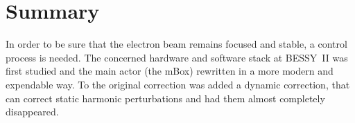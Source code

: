 \section{Summary}
In order to be sure that the electron beam remains focused and stable, a control process is needed. The concerned hardware and software stack at BESSY~II was first studied and the main actor (the mBox) rewritten in a more modern and expendable way. To the original correction was added a dynamic correction, that can correct static harmonic perturbations and had them almost completely disappeared.

